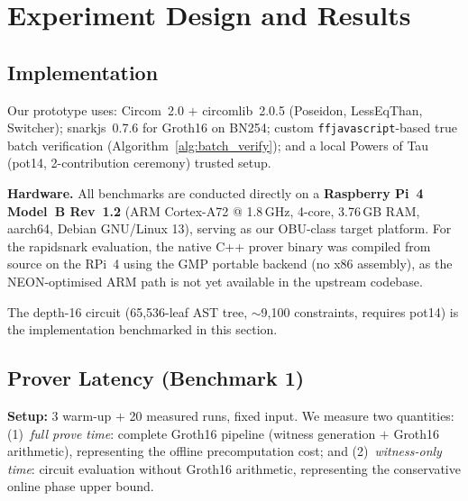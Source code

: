 \section{Experiment Design and Results}
\label{sec:experiment}

\subsection{Implementation}

Our prototype uses: Circom~2.0 $+$ circomlib~2.0.5 (Poseidon, LessEqThan,
Switcher); snarkjs~0.7.6 for Groth16 on BN254; custom \texttt{ffjavascript}-based
true batch verification (Algorithm~\ref{alg:batch_verify}); and a local Powers of
Tau (pot14, 2-contribution ceremony) trusted setup.

\textbf{Hardware.} All benchmarks are conducted directly on a \textbf{Raspberry Pi~4
Model~B Rev~1.2} (ARM Cortex-A72 @ 1.8\,GHz, 4-core, 3.76\,GB RAM, aarch64,
Debian GNU/Linux 13), serving as our OBU-class target platform.
For the rapidsnark evaluation, the native C++ prover binary was compiled from source
on the RPi~4 using the GMP portable backend (no x86 assembly), as the
NEON-optimised ARM path is not yet available in the upstream codebase.

The depth-16 circuit (65{,}536-leaf AST tree, $\sim$9{,}100 constraints, requires
pot14) is the implementation benchmarked in this section.

\subsection{Prover Latency (Benchmark 1)}

\textbf{Setup:} 3 warm-up $+$ 20 measured runs, fixed input. We measure two
quantities: (1)~\emph{full prove time}: complete Groth16 pipeline (witness
generation $+$ Groth16 arithmetic), representing the offline precomputation cost;
and (2)~\emph{witness-only time}: circuit evaluation without Groth16 arithmetic,
representing the conservative online phase upper bound.

\begin{table}[t]
\centering
\caption{Prover Latency Benchmark on RPi~4 (depth-16, BN254, mean $\pm$ std)}
\label{tab:benchmark}
\end{table}

